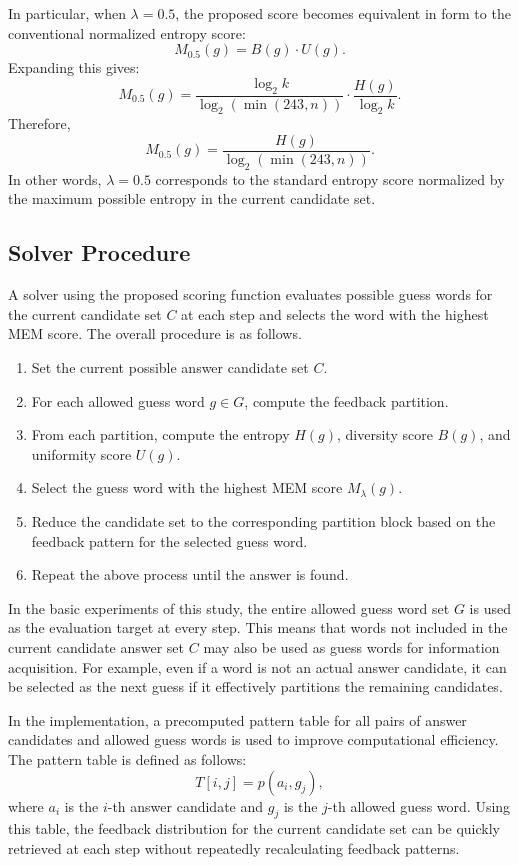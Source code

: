 \documentclass[11pt]{article}
\begin{document}
In particular, when $\lambda = 0.5$, the proposed score becomes equivalent in form to the conventional normalized entropy score:
\[
M_{0.5}(g)
=
B(g) \cdot U(g).
\]
Expanding this gives:
\[
M_{0.5}(g)
=
\frac{\log_2 k}{\log_2(\min(243,n))}
\cdot
\frac{H(g)}{\log_2 k}.
\]
Therefore,
\[
M_{0.5}(g)
=
\frac{H(g)}{\log_2(\min(243,n))}.
\]
In other words, $\lambda = 0.5$ corresponds to the standard entropy score normalized by the maximum possible entropy in the current candidate set.

\subsection{Solver Procedure}

A solver using the proposed scoring function evaluates possible guess words for the current candidate set $C$ at each step and selects the word with the highest MEM score.
The overall procedure is as follows.

\begin{enumerate}
    \item Set the current possible answer candidate set $C$.
    \item For each allowed guess word $g \in G$, compute the feedback partition.
    \item From each partition, compute the entropy $H(g)$, diversity score $B(g)$, and uniformity score $U(g)$.
    \item Select the guess word with the highest MEM score $M_{\lambda}(g)$.
    \item Reduce the candidate set to the corresponding partition block based on the feedback pattern for the selected guess word.
    \item Repeat the above process until the answer is found.
\end{enumerate}

In the basic experiments of this study, the entire allowed guess word set $G$ is used as the evaluation target at every step.
This means that words not included in the current candidate answer set $C$ may also be used as guess words for information acquisition.
For example, even if a word is not an actual answer candidate, it can be selected as the next guess if it effectively partitions the remaining candidates.

In the implementation, a precomputed pattern table for all pairs of answer candidates and allowed guess words is used to improve computational efficiency.
The pattern table is defined as follows:
\[
T[i,j] = p(a_i, g_j),
\]
where $a_i$ is the $i$-th answer candidate and $g_j$ is the $j$-th allowed guess word.
Using this table, the feedback distribution for the current candidate set can be quickly retrieved at each step without repeatedly recalculating feedback patterns.
\end{document}
